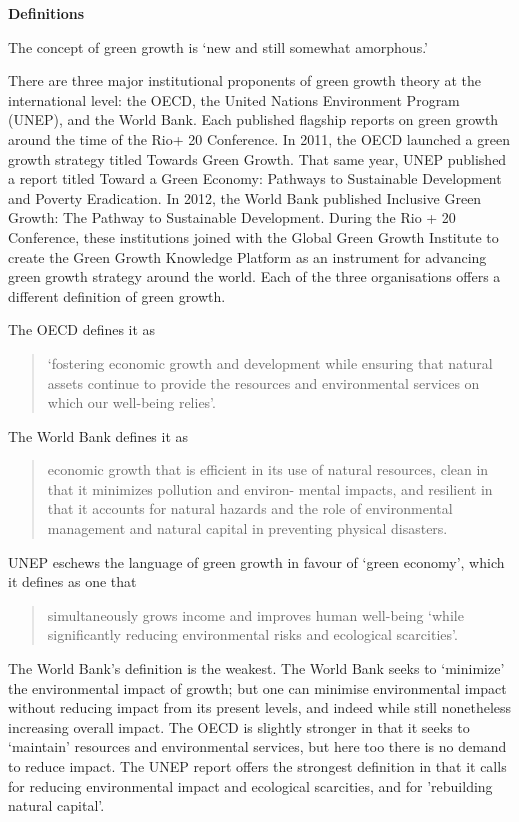 \documentclass[
]{book}
\begin{document}
\textbf{Definitions}

The concept of green growth is `new and still somewhat amorphous.'

There are three major institutional proponents of green growth theory at the international level: the
OECD, the United Nations Environment Program (UNEP), and the World Bank. Each published flagship
reports on green growth around the time of the Rio+ 20 Conference. In 2011, the OECD launched a
green growth strategy titled Towards Green Growth. That same year, UNEP published a report titled
Toward a Green Economy: Pathways to Sustainable Development and Poverty Eradication. In 2012, the
World Bank published Inclusive Green Growth: The Pathway to Sustainable Development. During the Rio
+ 20 Conference, these institutions joined with the Global Green Growth Institute to create the Green
Growth Knowledge Platform as an instrument for advancing green growth strategy around the world.
Each of the three organisations offers a different definition of green growth.

The OECD defines it as

\begin{quote}
`fostering economic growth and development while ensuring that natural assets continue to provide
the resources and environmental services on which our well-being relies'.
\end{quote}

The World Bank defines it as

\begin{quote}
economic growth that is efficient in its use of natural resources, clean in that it minimizes pollution and environ-
mental impacts, and resilient in that it accounts for natural hazards and the role of environmental management and natural capital in preventing physical disasters.
\end{quote}

UNEP eschews the language of green growth in favour of `green economy', which it defines as one
that

\begin{quote}
simultaneously grows income and improves human well-being `while significantly reducing
environmental risks and ecological scarcities'.
\end{quote}

The World
Bank's definition is the weakest. The World Bank seeks to `minimize' the environmental impact of
growth; but one can minimise environmental impact without reducing impact from its present
levels, and indeed while still nonetheless increasing overall impact. The OECD is slightly stronger
in that it seeks to `maintain' resources and environmental services, but here too there is no
demand to reduce impact. The UNEP report offers the strongest definition in that it calls for reducing
environmental impact and ecological scarcities, and for 'rebuilding natural capital'.
\end{document}
